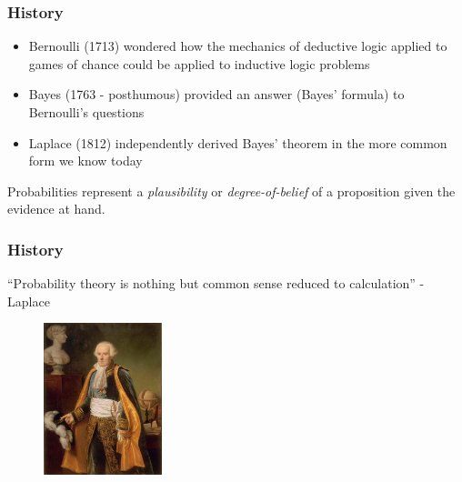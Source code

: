 \begin{frame}

\frametitle{History}
\label{history}

\begin{itemize}
\item Bernoulli (1713) wondered how the mechanics of deductive logic applied to games of chance
could be applied to inductive logic problems

\item Bayes (1763 - posthumous) provided an answer (Bayes' formula) to Bernoulli's questions

\item Laplace (1812) independently derived Bayes' theorem in the more common form we know today

\end{itemize}

Probabilities represent a \emph{plausibility} or \emph{degree-of-belief} of a proposition given the evidence at hand.

\end{frame}

\begin{frame}

\frametitle{History}
\label{history}

``Probability theory is nothing but common sense reduced to calculation'' - Laplace

\begin{figure}[htbp]
\centering
\includegraphics[keepaspectratio,width=\textwidth,height=125pt]{figures/laplace.jpg}
\label{laplace}
\end{figure}

\end{frame}

